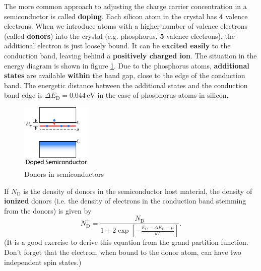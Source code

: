 \documentclass[11pt]{article}
\begin{document}
\begin{enumerate}[resume]
The more common approach to adjusting the charge carrier concentration in a semiconductor is called {\bf doping}. Each silicon atom in the crystal has {\bf 4} valence electrons. When we introduce atoms with a higher number of valence electrons (called {\bf donors}) into the crystal (e.g. phosphorus, {\bf 5} valence electrons), the additional electron is just loosely bound. It can be {\bf excited easily} to the conduction band, leaving behind a {\bf positively charged ion}. The situation in the energy diagram is shown in figure \ref{donors}. Due to the phosphorus atoms, {\bf additional states} are available {\bf within} the band gap, close to the edge of the conduction band. The energetic distance between the additional states and the conduction band edge is $\Delta E_\text{D}=0.044\,\mathrm{eV}$ in the case of phosphorus atoms in silicon.

\begin{figure}[h]
\centering
\includegraphics[width=0.3\textwidth]{donorlevels.jpg}
\caption{Donors in semiconductors}
\label{donors}
\end{figure}

If $N_\text{D}$ is the density of donors in the semiconductor host material, the density of {\bf ionized} donors (i.e. the density of electrons in the conduction band stemming from the donors) is given by
\begin{equation}N_\text{D}^+=\frac{N_\text{D}}{1+2\exp\left[-\frac{E_\text{C}-\Delta E_\text{D}-\mu}{kT}\right]}.\label{ion}\end{equation}
(It is a good exercise to derive this equation from the grand partition function. Don't forget that the electron, when bound to the donor atom, can have two independent spin states.)


\end{enumerate}
\end{document}
